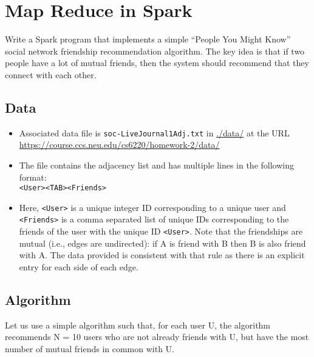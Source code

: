 \documentclass[paper=a4, fontsize=11pt]{scrartcl} %
\author{
    \textbf{YOUR NAME} \\ 
    \textbf{YOUR GIT USERNAME} \\ 
    \textbf{YOUR E-MAIL}
}%
\begin{document}
\maketitle %

\section{Map Reduce in Spark}

Write a Spark program that implements a simple “People You Might Know” social network friendship recommendation algorithm. The key idea is that if two people have a lot of mutual friends, then the system should recommend that they connect with each other. 

\subsection{Data}



\begin{itemize}
    \item Associated data file is \verb"soc-LiveJournal1Adj.txt" in \href{https://course.ccs.neu.edu/cs6220/homework-2/data/}{./data/} at the URL \url{https://course.ccs.neu.edu/cs6220/homework-2/data/}
    \item The file contains the adjacency list and has multiple lines in the following format: \\ \verb"<User><TAB><Friends>"
    \item Here, \verb"<User>" is a unique integer ID corresponding to a unique user and \verb"<Friends>" is a comma separated list of unique IDs corresponding to the friends of the user with the unique ID \verb"<User>". Note that the friendships are mutual (i.e., edges are undirected): if A is friend with B then B is also friend with A. The data provided is consistent with that rule as there is an explicit entry for each side of each edge.
\end{itemize}

\subsection{Algorithm}
Let us use a simple algorithm such that, for each user U, the algorithm recommends N = 10 users who are not already friends with U, but have the most number of mutual friends in common with U. 
\end{document}
